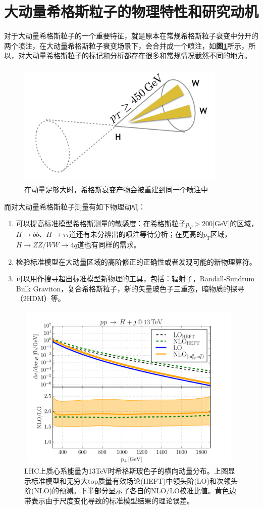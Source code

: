 \section{大动量希格斯粒子的物理特性和研究动机}
对于大动量希格斯粒子的一个重要特征，就是原本在常规希格斯粒子衰变中分开的两个喷注，在大动量希格斯粒子衰变场景下，会合并成一个喷注，如\textbf{图\ref{fig:2.1}}所示，所以，对大动量希格斯粒子的标记和分析都存在很多和常规情况截然不同的地方。
\begin{figure}[H]
 \centering
 \includegraphics[height=6cm, width=10cm]{pictures/mergedjet.jpg}
  \caption{在动量足够大时，希格斯衰变产物会被重建到同一个喷注中}
 \label{fig:2.1}
\end{figure}

而对大动量希格斯粒子测量有如下物理动机：
\begin{enumerate}
    \item 可以提高标准模型希格斯测量的敏感度：在希格斯粒子$p_T>200$[GeV]的区域，$H\to bb$、$H\to\tau\tau$道还有未分辨出的喷注等待分析；在更高的$p_T$区域，$H\to ZZ/WW\to 4q$道也有同样的需求。
    \item 检验标准模型在大动量区域的高阶修正的正确性或者发现可能的新物理算符。
    \item 可以用作搜寻超出标准模型新物理的工具，包括：辐射子，Randall-Sundrum Bulk Graviton，复合希格斯粒子，新的矢量玻色子三重态，暗物质的探寻（2HDM）等。
\end{enumerate}

\begin{figure}[H]
 \centering
 \includegraphics[height=8cm, width=11cm]{pictures/SM_NLO:LO.png}
  \caption{LHC上质心系能量为13TeV时希格斯玻色子的横向动量分布。上图显示标准模型和无穷大top质量有效场论(HEFT)中领头阶(LO)和次领头阶(NLO)的预测。下半部分显示了各自的NLO/LO校准比值。黄色边带表示由于尺度变化导致的标准模型结果的理论误差。\cite{Higgs_high_pt}}
 \label{fig:2.2}
\end{figure}

